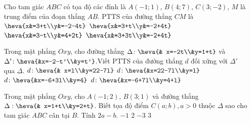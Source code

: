 \begin{ex}%
	Cho tam giác $ABC$ có tọa độ các đỉnh là $A(-1;1)$, $B(4;7)$, $C(3;-2)$, $M$ là trung điểm của đoạn thẳng $AB$. PTTS của đường thẳng $CM$ là
	\choice
	{\True $\heva{x&=3+t\\y&=-2-4t}$}
	{$\heva{x&=3+t\\y&=-2+4t}$}
	{$\heva{x&=3-t\\y&=4+2t}$}
	{$\heva{x&=3+3t\\y&=-2+4t}$}
\end{ex}
\begin{ex}%
	Trong mặt phẳng $Oxy$, cho đường thẳng $\Delta\colon \heva{& x=-2t\\&y=1+t}$ và $\Delta'\colon \heva{&x=-2-t'\\&y=t'}$.Viết PTTS của đường thẳng $d$ đối xứng với $\Delta'$ qua $\Delta$. \choice
	{$d\colon \heva{& x=l\\&y=22-7l}$}
	{\True $d\colon \heva{&x=22-7l\\&y=l}$}
	{$d\colon \heva{&x=-6+3l\\&y=4}$}
	{$d\colon \heva{&x=-6+7l\\&y=4+l}$}
\end{ex}
\begin{ex}%
	Trong mặt phẳng $Oxy$, cho $A(-1;2)$, $B(3;1)$ và đường thẳng $\Delta: \heva{& x=1+t\\&y=2+t}$. Biết tọa độ điểm $C(a; b), a>0$ thuộc $\Delta$ sao cho tam giác $ABC$ cân tại $B$. Tính $2a -b$.\choice
	{$-1$}
	{$2$}
	{\True$-3$}
	{$3$}
\end{ex}

